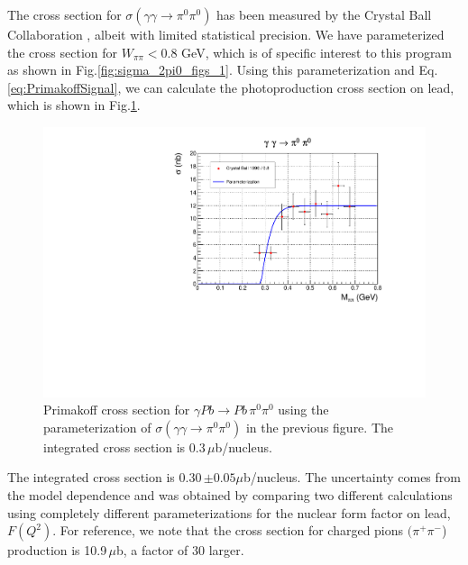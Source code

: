 The cross section for $\sigma(\gamma\gamma\rightarrow\pi^0\pi^0)$ has
been measured by the Crystal Ball Collaboration
\cite{Marsiske:1990hx}, albeit with limited statistical precision. We
have parameterized the cross section for $W_{\pi\pi}<0.8$ GeV, which
is of specific interest to this program as shown in
Fig.\ref{fig:sigma_2pi0_figs_1}. Using this parameterization and
Eq.\ref{eq:PrimakoffSignal}, we can calculate the photoproduction
cross section on lead, which is shown in
Fig.\ref{fig:sigma_2pi0_figs_2}.
\begin{figure}[tph]
\centering
\includegraphics[page=2,width=4.75in]{figures/sigma_2pi0_figs.pdf}
\caption{Primakoff cross section for $\gamma Pb \rightarrow Pb\, \pi^0 \pi^0$ using the parameterization of  $\sigma(\gamma\gamma\rightarrow \pi^0\pi^0)$ in the previous figure. The integrated cross section is 0.3\,$\mu$b/nucleus.
\label{fig:sigma_2pi0_figs_2}}
\end{figure}
The integrated cross section is 0.30\,$\pm0.05\mu$b/nucleus. The uncertainty comes from the model dependence and was obtained by comparing two different calculations using completely different parameterizations for the nuclear form factor on lead, $F(Q^2)$. For reference,
we note that the cross section for charged pions $(\pi^+\pi^-$)
production is 10.9\,$\mu$b, a factor of 30 larger.

